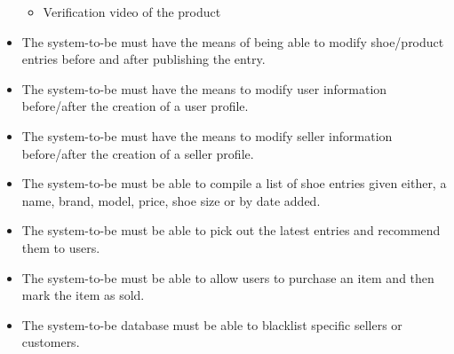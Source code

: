 \begin{itemize}
\begin{itemize}
          \item Verification video of the product
        \end{itemize}
  \item The system-to-be must have the means of being able to modify shoe/product entries before and after publishing the entry.
  \item The system-to-be must have the means to modify user information before/after the creation of a user profile.
  \item The system-to-be must have the means to modify seller information before/after the creation of a seller profile.
  \item The system-to-be must be able to compile a list of shoe entries given either, a name, brand, model, price, shoe size or by date added.
  \item The system-to-be must be able to pick out the latest entries and recommend them to users.
  \item The system-to-be must be able to allow users to purchase an item and then mark the item as sold.
  \item The system-to-be database must be able to blacklist specific sellers or customers.
\end{itemize}
